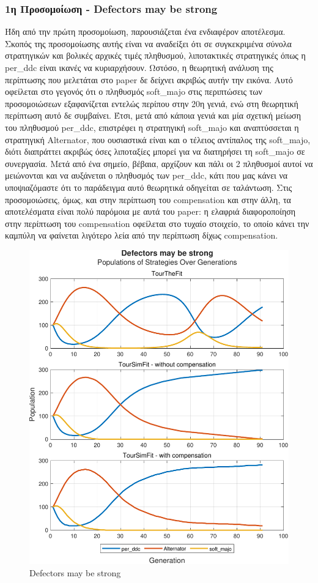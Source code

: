 \documentclass[12pt]{article}
\begin{document}
\subsubsection{1η Προσομοίωση - Defectors may be strong}
Ήδη από την πρώτη προσομοίωση, παρουσιάζεται ένα ενδιαφέρον αποτέλεσμα. Σκοπός της προσομοίωσης αυτής είναι να αναδείξει ότι σε συγκεκριμένα σύνολα στρατηγικών και βολικές αρχικές τιμές πληθυσμού, λιποτακτικές στρατηγικές όπως η per\_ddc είναι ικανές να κυριαρχήσουν. Ωστόσο, η θεωρητική ανάλυση της περίπτωσης που μελετάται στο paper δε δείχνει ακριβώς αυτήν την εικόνα. Αυτό οφείλεται στο γεγονός ότι ο πληθυσμός soft\_majo στις περιπτώσεις των προσομοιώσεων εξαφανίζεται εντελώς περίπου στην 20η γενιά, ενώ στη θεωρητική περίπτωση αυτό δε συμβαίνει. Έτσι, μετά από κάποια γενιά και μία σχετική μείωση του πληθυσμού per\_ddc, επιστρέφει η στρατηγική soft\_majo και αναπτύσσεται η στρατηγική Alternator, που ουσιαστικά είναι και ο τέλειος αντίπαλος της soft\_majo, διότι διαπράττει ακριβώς όσες λιποταξίες μπορεί για να διατηρήσει τη soft\_majo σε συνεργασία. Μετά από ένα σημείο, βέβαια, αρχίζουν και πάλι οι 2 πληθυσμοί αυτοί να μειώνονται και να αυξάνεται ο πληθυσμός των per\_ddc, κάτι που μας κάνει να υποψιαζόμαστε ότι το παράδειγμα αυτό θεωρητικά οδηγείται σε ταλάντωση. Στις προσομοιώσεις, όμως, και στην περίπτωση του compensation και στην άλλη, τα αποτελέσματα είναι πολύ παρόμοια με αυτά του paper: η ελαφριά διαφοροποίηση στην περίπτωση του compensation οφείλεται στο τυχαίο στοιχείο, το οποίο κάνει την καμπύλη να φαίνεται λιγότερο λεία από την περίπτωση δίχως compensation.
	\begin{figure}[h]
	      \centering
	      \includegraphics[scale=0.8]{Defectors may be strong.pdf}
	      \caption{Defectors may be strong}
	\end{figure}
\end{document}
